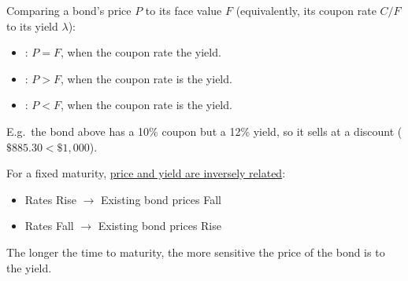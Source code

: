 \begin{definition}
    Comparing a bond's price $P$ to its face value $F$ (equivalently, its coupon rate $C/F$ to its yield $\lambda$):
    \begin{itemize}
        \item {}: $P = F$, when the coupon rate  the yield.
        \item {}: $P > F$, when the coupon rate is  the yield.
        \item {}: $P < F$, when the coupon rate is  the yield.
    \end{itemize}
\end{definition}
E.g.\ the bond above has a 10\% coupon but a 12\% yield, so it sells at a discount ($\$885.30 < \$1,000$).

For a fixed maturity, \underline{price and yield are inversely related}:
\begin{itemize}
    \item Rates Rise $\rightarrow$ Existing bond prices Fall
    \item Rates Fall $\rightarrow$ Existing bond prices Rise
\end{itemize}
The longer the time to maturity, the more sensitive the price of the bond is to the yield.

\begin{center}
\end{center}

